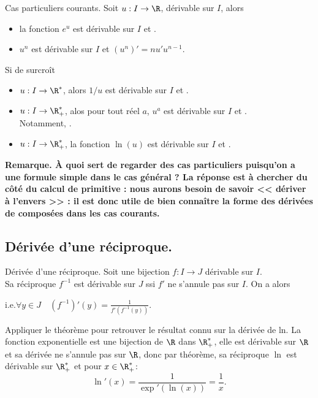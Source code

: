 \documentclass[11pt]{article}
\begin{document}
\begin{corr}{Cas particuliers courants.}{}
    Soit $u:I\to\R$, dérivable sur $I$, alors
    \begin{itemize}
        \item la fonction $e^u$ est dérivable sur $I$ et .
        \item $u^n$ est dérivable sur $I$ et $(u^n)'=nu'u^{n-1}$.
    \end{itemize}
    Si de surcroît
    \begin{itemize}
        \item $u:I\to\R^*$, alors $1/u$ est dérivable sur $I$ et .
        \item $u:I\to\R_+^*$, alos pour tout réel $a$, $u^a$ est dérivable sur $I$ et .\\
        Notamment, .
        \item $u:I\to\R_+^*$, la fonction $\ln(u)$ est dérivable sur $I$ et .
    \end{itemize}
\end{corr}

\bf{Remarque.} À quoi sert de regarder des cas particuliers puisqu'on a une formule simple dans le cas général ? La réponse est à chercher du côté du calcul de primitive : nous aurons besoin de savoir << dériver à l'envers >> : il est donc utile de bien connaître la forme des dérivées de composées dans les cas courants.

\subsection{Dérivée d'une réciproque.}

\begin{thm}{Dérivée d'une réciproque.}{}
    Soit une bijection $f:I\to J$ dérivable sur $I$.\\
    Sa réciproque $f^{-1}$ est dérivable sur $J$ ssi $f'$ ne s'annule pas sur $I$. On a alors
    \begin{center}
        \quad i.e.\quad $\forall y\in J\quad(f^{-1})'(y)=\frac{1}{f'(f^{-1}(y))}$.
    \end{center}
\end{thm}

\begin{ex}{}{}
    Appliquer le théorème pour retrouver le résultat connu sur la dérivée de ln.
    \tcblower
    La fonction exponentielle est une bijection de $\R$ dans $\R_+^*$, elle est dérivable sur $\R$ et sa dérivée ne s'annule pas sur $\R$, donc par théorème, sa réciproque $\ln$ est dérivable sur $\R_+^*$ et pour $x\in\R_+^*$:
    \begin{equation*}
        \ln'(x)=\frac{1}{\exp'(\ln(x))}=\frac{1}{x}.
    \end{equation*}
\end{ex}
\end{document}
